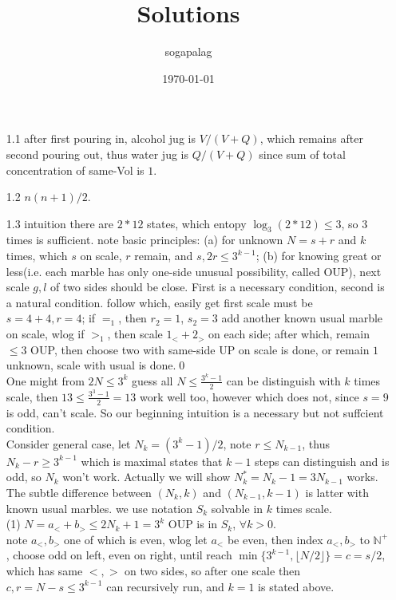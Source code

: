 \documentclass[paper=a4, fontsize=11pt]{scrartcl} %
\title{Solutions}
\author{sogapalag}
\date{\normalsize\today}
\numberwithin{equation}{section} %
\numberwithin{figure}{section} %
\numberwithin{table}{section} %
\begin{document}
\maketitle

\begin{itemize}
	\item[1.1] after first pouring in, alcohol jug is $V/(V+Q)$, which remains after second pouring out, thus water jug is $Q/(V+Q)$ since sum of total concentration of same-Vol is $1$.
	\item[1.2] $n(n+1)/2$.
	\item[1.3] intuition there are $2*12$ states, which entopy $\log_3 (2*12)\leq 3$, so $3$ times is sufficient. note basic principles: (a) for unknown $N=s+r$ and $k$ times, which $s$ on scale, $r$ remain, and $s,2r \leq 3^{k-1}$; (b) for knowing great or less(i.e. each marble has only one-side unusual possibility, called OUP), next scale $g,l$ of two sides should be close. First is a necessary condition, second is a natural condition. follow which, easily get first scale must be $s=4+4,r=4$; if $=_1$, then $r_2=1$, $s_2=3$ add another known usual marble on scale, wlog if $>_1$, then scale $1_< + 2_>$ on each side; after which, remain $\leq 3$ OUP, then choose two with same-side UP on scale is done, or remain $1$ unknown, scale with usual is done.\qed\\
	One might from $2N\leq 3^k$ guess all $N\leq \frac{3^k-1}{2}$ can be distinguish with $k$ times scale, then $13\leq \frac{3^3-1}{2}=13$ work well too, however which does not, since $s=9$ is odd, can't scale. So our beginning intuition is a necessary but not suffcient condition.\\
	Consider general case, let $N_k = (3^k-1)/2$, note $r\leq N_{k-1}$, thus $N_k-r\geq 3^{k-1}$ which is maximal states that $k-1$ steps can distinguish and is odd, so $N_k$ won't work. Actually we will show $N_k^* = N_k-1 = 3N_{k-1}$ works. The subtle difference between $(N_k,k)$ and $(N_{k-1},k-1)$ is latter with known usual marbles. we use notation $S_k$ solvable in $k$ times scale.\\
	(1) $N=a_<+b_>\leq 2N_k+1=3^k$ OUP is in $S_k$, $\forall k>0$.\\
	note $a_<,b_>$ one of which is even, wlog let $a_<$ be even, then index $a_<,b_>$ to $\mathbb{N}^+$, choose odd on left, even on right, until reach $\min\{3^{k-1}, \lfloor N/2\rfloor\} =c=s/2$, which has same $<,>$ on two sides, so after one scale then $c,r=N-s \leq 3^{k-1}$ can recursively run, and $k=1$ is stated above.\\

\end{itemize}
\end{document}

